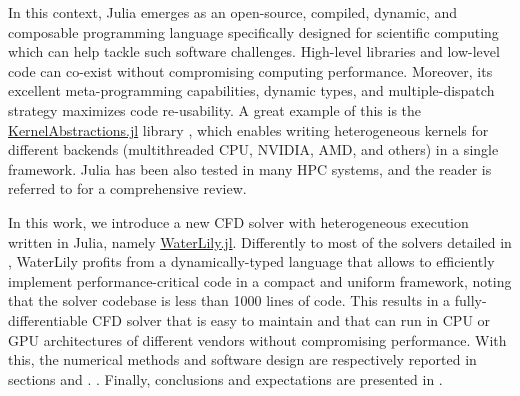 \documentclass[10pt,a4paper]{article}
\begin{document}
In this context, Julia \citep{Bezanson2017} emerges as an open-source, compiled, dynamic, and composable programming language specifically designed for scientific computing which can help tackle such software challenges. High-level libraries and low-level code can co-exist without compromising computing performance. Moreover, its excellent meta-programming capabilities, dynamic types, and multiple-dispatch strategy maximizes code re-usability. A great example of this is the \href{https://github.com/JuliaGPU/KernelAbstractions.jl}{KernelAbstractions.jl} library \citep{Churavy2023}, which enables writing heterogeneous kernels for different backends (multithreaded CPU, NVIDIA, AMD, and others) in a single framework.
Julia has been also tested in many HPC systems, and the reader is referred to \cite{Churavy2022} for a comprehensive review.

In this work, we introduce a new CFD solver with heterogeneous execution written in Julia, namely \href{https://github.com/WaterLily-jl/WaterLily.jl}{WaterLily.jl}. Differently to most of the solvers detailed in , WaterLily profits from a dynamically-typed language that allows to efficiently implement performance-critical code in a compact and uniform framework, noting that the solver codebase is less than 1000 lines of code. This results in a fully-differentiable CFD solver that is easy to maintain and that can run in CPU or GPU architectures of different vendors without compromising performance. With this, the numerical methods and software design are respectively reported in sections  and . . Finally, conclusions and expectations are presented in .
\end{document}
